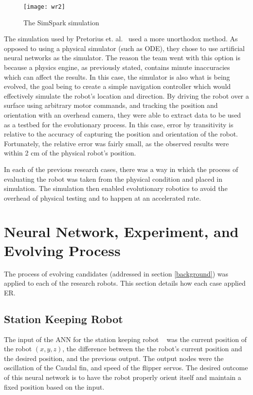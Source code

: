 \documentclass{sig-alternate}
\begin{document}
 \begin{figure}%
 \begin{center}
  \texttt{[image: wr2]}
 \end{center}
\caption{The SimSpark simulation}
\label{fig:simSpark}
\end{figure}
 
 The simulation used by Pretorius et. al.~\cite{Pretorius:2009:TAN:1632149.1632171} used a more unorthodox method. As opposed to using a physical simulator (such as ODE), they chose to use artificial neural networks as the simulator. The reason the team went with this option is because a physics engine, as previously stated, contains minute inaccuracies which can affect the results. In this case, the simulator is also what is being evolved, the goal being to create a simple navigation controller which would effectively simulate the robot's location and direction. By driving the robot over a surface using arbitrary motor commands, and tracking the position and orientation with an overhead camera, they were able to extract data to be used as a testbed for the evolutionary process. In this case, error by transitivity is relative to the accuracy of capturing the position and orientation of the robot. Fortunately, the relative error was fairly small, as the observed results were within 2 cm of the physical robot's position. 
 
 In each of the previous research cases, there was a way in which the process of evaluating the robot was taken from the physical condition and placed in simulation. The simulation then enabled evolutionary robotics to avoid the overhead of physical testing and to happen at an accelerated rate.

\section{Neural Network, Experiment, and Evolving Process}\label{evolution}
  The process of evolving candidates (addressed in section \ref{background}) was applied to each of the research robots. This section details how each case applied ER.
  \subsection{Station Keeping Robot}\label{Moore Evolving}
  The input of the ANN for the station keeping robot ~\cite{Moore:2013:ESK:2463372.2463402} was the current position of the robot $(x,y,z)$, the difference between the the robot's current position and the desired position, and the previous output. The output nodes were the oscillation of the Caudal fin, and speed of the flipper servos. The desired outcome of this neural network is to have the robot properly orient itself and maintain a fixed position based on the input.
  
\end{document}
